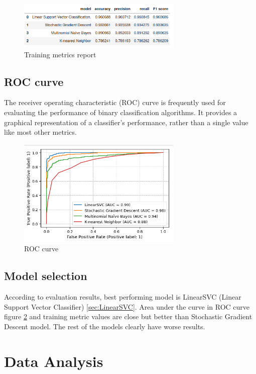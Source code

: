 \begin{figure}[H]
	\centering
	\includegraphics[width=0.7\textwidth]{figs/metrics.png}
	\caption{Training metrics report}
	\label{fig:metrics}
\end{figure}

\subsection{ROC curve}

The receiver operating characteristic (ROC) curve \cite{gonccalves2014roc} is frequently used for evaluating the performance of binary classification algorithms. It provides a graphical representation of a classifier’s performance, rather than a single value like most other metrics.

\begin{figure}[H]
	\centering
	\includegraphics[width=0.7\textwidth]{figs/roc.png}
	\caption{ROC curve}
	\label{fig:roc}
\end{figure}

\subsection{Model selection}

According to evaluation results, best performing model is LinearSVC (Linear Support Vector Classifier) \ref{sec:LinearSVC}. Area under the curve in ROC curve figure \ref{fig:roc} and training metric values are close but better than Stochastic Gradient Descent model. The rest of the models clearly have worse results.

\section{Data Analysis}
\label{sec:analysis}

